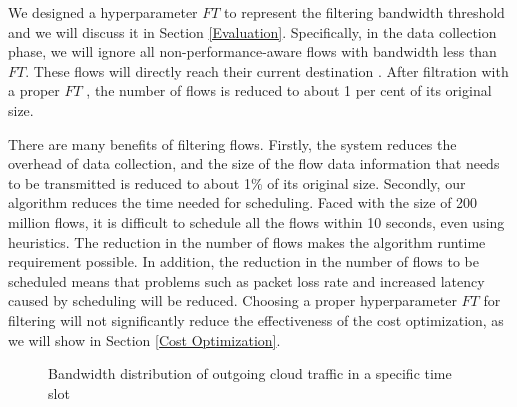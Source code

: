 We designed a hyperparameter $FT$ to represent the filtering bandwidth threshold and we will discuss it in Section \ref{Evaluation}. Specifically, in the data collection phase, we will ignore all non-performance-aware flows with bandwidth less than $FT$. These flows will directly reach their current destination {\egresses}. After filtration with a proper $FT$ , the number of flows is reduced to about 1 per cent of its original size.

There are many benefits of filtering flows. Firstly, the system reduces the overhead of data collection, and the size of the flow data information that needs to be transmitted is reduced to about 1\% of its original size. Secondly, our algorithm reduces the time needed for scheduling. Faced with the size of 200 million flows, it is difficult to schedule all the flows within 10 seconds, even using heuristics. The reduction in the number of flows makes the algorithm runtime requirement possible. In addition, the reduction in the number of flows to be scheduled means that problems such as packet loss rate and increased latency caused by scheduling will be reduced. Choosing a proper hyperparameter $FT$ for filtering will not significantly reduce the effectiveness of the cost optimization, as we will show in Section \ref{Cost Optimization}.


\begin{figure}
    \centering
    \label{fig:distriAllFlow}
    \quad
    \caption{Bandwidth distribution of outgoing cloud traffic in a specific time slot}
    \label{fig:distriPerfFlow}
    \label{fig:distriFlow}
\end{figure}

